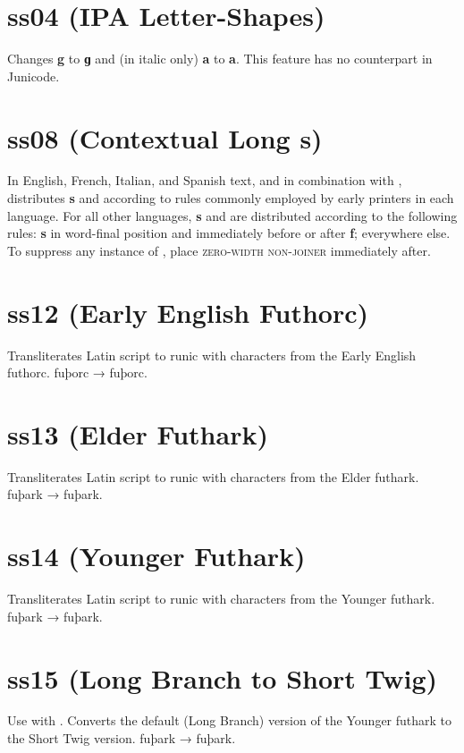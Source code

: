 \documentclass[12pt,letterpaper,openany]{book}
\begin{document}
\section{ss04 (IPA Letter-Shapes)}
Changes \textbf{g} to \textbf{ɡ} and (in italic only)
\textbf{a} to \textbf{ a}. This feature has no counterpart in
Junicode.

\section{ss08 (Contextual Long s)}
In English, French, Italian, and Spanish text, and in combination with , distributes \textbf{s} and
\textbf{}
according to rules commonly employed by early printers in each language. For all other languages,
\textbf{s} and \textbf{} are distributed according to the following rules:
\textbf{s} in word-final position and immediately before or after \textbf{f};
\textbf{} everywhere else. To suppress any instance of \textbf{},
place  \textsc{zero-width non-joiner} immediately after.

\section{ss12 (Early English Futhorc)}
Transliterates Latin script to runic with characters from the Early English futhorc. fuþorc
→ { fuþorc}.

\section{ss13 (Elder Futhark)}
Transliterates Latin script to runic with characters from the Elder futhark. fuþark
→ { fuþark}.

\section{ss14 (Younger Futhark)}
Transliterates Latin script to runic with characters from the Younger futhark. fuþark
→ { fuþark}.

\section{ss15 (Long Branch to Short Twig)}
Use with . Converts the default (Long Branch) version of the Younger futhark
to the Short Twig version. fuþark
→ { fuþark}.
\end{document}
